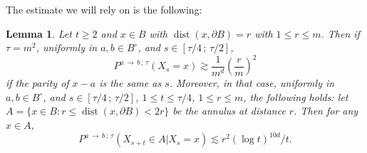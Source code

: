 \documentclass[10pt]{amsart}
\newtheorem{lemm}[theo]{Lemma}\newtheorem{prop}[theo]{Proposition}\newtheorem{coro}[theo]{Corollary}\newtheorem{conj}[theo]{Conjecture}
\theoremstyle{definition}\newtheorem{defi}[theo]{Definition}\newtheorem{rema}[theo]{Remark}\newtheorem{exam}[theo]{Example}\newtheorem{exem}[theo]{Example}\newtheorem{nota}[theo]{Notation}
\DeclareMathOperator{\dist}{dist}
\newcommand{\Pmh}{P}
\begin{document}
The estimate we will rely on is the following:

\begin{lemm}\label{L:HKexc}
Let $t \ge 2$ and $x \in B$ with $\dist (x, \partial B) =r$ with $1 \le r \le m$. Then if $\tau = m^2$, uniformly in $a, b \in B^\circ$, and $s \in [\tau/4\,;\,\tau/2]$,
\begin{equation}\label{HKlb}
\Pmh^{a\,\to\,b\,;\,\tau} (X_s = x) \gtrsim \frac1{m^d} \left(\frac{r}{m}\right)^2
\end{equation}
if the parity of $x - a$ is the same as $s$. Moreover, in that case, uniformly in $a, b \in B^\circ$, and $s \in [\tau/4\,;\,\tau/2]$, $1 \le t \le \tau/4$, $ 1\le r \le m$, the following holds: let $A = \{x \in B : r \le \dist(x, \partial B) < 2r \}$ be the annulus at distance $r$. Then for any $x \in A$,
\begin{equation}\label{HKub}
\Pmh^{a\,\to\,b\,;\,\tau} (X_{s+ t} \in A | X_s = x) \lesssim r^2 (\log t)^{10d} / t.
\end{equation}
\end{lemm}
\end{document}
